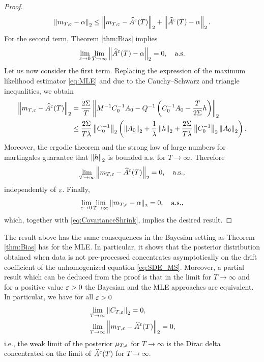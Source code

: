 \documentclass[10pt]{article}
\begin{document}
\begin{proof}
\begin{equation}
		\left\|m_{T,\varepsilon} - \alpha\right\|_2 \leq \left\|m_{T,\varepsilon} - \widehat A^\varepsilon(T)\right\|_2 + \left\|\widehat A^\varepsilon(T) - \alpha\right\|_2.
	\end{equation}
	For the second term, Theorem \ref{thm:Bias} implies 
	\begin{equation}
		\lim_{\varepsilon \to 0} \lim_{T \to \infty}\left\|\widehat A^\varepsilon(T) - \alpha\right\|_2 = 0, \quad \text{a.s.}
	\end{equation}
	Let us now consider the first term.	Replacing the expression of the maximum likelihood estimator \eqref{eq:MLE} and due to the Cauchy--Schwarz and triangle inequalities, we obtain
	\begin{equation}
	\begin{aligned}
		\left\|m_{T,\varepsilon} - \widehat A^\varepsilon(T)\right\|_2 &= \frac{2\Sigma}T\left\|M^{-1}C_0^{-1}A_0 - Q^{-1}\left(C_0^{-1}A_0 - \frac{T}{2\Sigma} h \right)\right\|_2\\
		&\leq \frac{2\Sigma}{T\bar \lambda} \left\|C_0^{-1}\right\|_2 \left(\left\|A_0\right\|_2 + \frac1{\bar \lambda}\left\|h\right\|_2 + \frac{2\Sigma}{T\bar \lambda} \left\|C_0^{-1}\right\|_2\left\|A_0\right\|_2\right).
	\end{aligned}
	\end{equation}
	Moreover, the ergodic theorem and the strong law of large numbers for martingales guarantee that $\left\|h\right\|_2$ is bounded a.s. for $T \to \infty$. Therefore
	\begin{equation}
	\lim_{T\to\infty} \left\|m_{T,\varepsilon} - \widehat A^\varepsilon(T)\right\|_2 = 0, \quad \text{a.s.},
	\end{equation}
	independently of $\varepsilon$. Finally, 
	\begin{equation}
		\lim_{\varepsilon \to 0} \lim_{T \to \infty}\left\|m_{T,\varepsilon} - \alpha\right\|_2 = 0, \quad \text{a.s.},
	\end{equation}
	which, together with \eqref{eq:CovarianceShrink}, implies the desired result. 
\end{proof}

\begin{remark} The result above has the same consequences in the Bayesian setting as Theorem \ref{thm:Bias} has for the MLE. In particular, it shows that the posterior distribution obtained when data is not pre-processed concentrates asymptotically on the drift coefficient of the unhomogenized equation \eqref{eq:SDE_MS}. Moreover, a partial result which can be deduced from the proof is that in the limit for $T \to \infty$ and for a positive value $\varepsilon > 0$ the Bayesian and the MLE approaches are equivalent. In particular, we have for all $\varepsilon > 0$
	\begin{equation}
	\begin{aligned}
		&\lim_{T\to\infty} \left\|C_{T,\varepsilon}\right\|_2 = 0,\\
		&\lim_{T \to\infty}\left\|m_{T,\varepsilon} - \widehat A^\varepsilon(T)\right\|_2 =0,
	\end{aligned}	
	\end{equation} 
	i.e., the weak limit of the posterior $\mu_{T,\varepsilon}$ for $T\to \infty$ is the Dirac delta concentrated on the limit of $\widehat A^\varepsilon(T)$ for $T\to \infty$. 
\end{remark}
\end{document}
